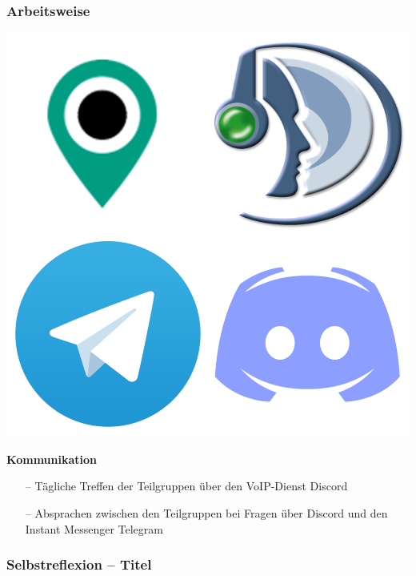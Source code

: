 \documentclass[aspectratio=1610]{beamer}
\begin{document}
    \begin{frame}[plain]
            \frametitle{\textbf{Arbeitsweise}}
            \begin{minipage}{0.5\textwidth}
        	    \includegraphics[width = \columnwidth - 30pt]
                {images/meet-im-voip.png}
            \end{minipage}%
            \begin{minipage}{0.5\textwidth}
                \textbf{Kommunikation}
                \begin{itemize}
                    \setlength\itemsep{0.3em}
                    \item[--] Tägliche Treffen der Teilgruppen über den
                        VoIP-Dienst Discord
                    \item[--] Absprachen zwischen den Teilgruppen bei Fragen
                        über Discord und den Instant Messenger Telegram
                \end{itemize}
            \end{minipage}
    \end{frame}



	\begin{frame}[plain]
        \frametitle{\textbf{Selbstreflexion} -- Titel}
    \end{frame}
\end{document}
